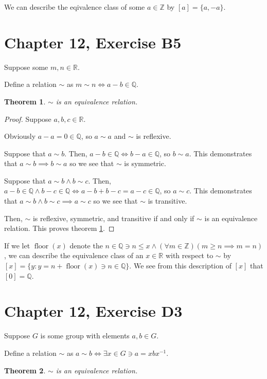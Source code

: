 \documentclass[12pt]{amsart}
\newcommand{\reals}{\mathbb{R}}
\newcommand{\rats}{\mathbb{Q}}
\newcommand{\ints}{\mathbb{Z}}
\newtheorem{thm}{Theorem}
\begin{document}
We can describe the eqivalence class of some $a \in \ints$
by $[a] = \{a, -a\}$.

\section{Chapter 12, Exercise B5}

Suppose some $m,n \in \reals$.

Define a relation $\sim$ as $m \sim n \iff a - b \in \rats$.

\begin{thm} \label{thm10}
	$\sim$ is an equivalence relation.
\end{thm}

\begin{proof}
	Suppose $a,b,c \in \reals$.

	Obviously $a - a = 0 \in \rats$,
	so $a \sim a$
	and $\sim$ is reflexive.

	Suppose that $a \sim b$.
	Then, $a - b \in \rats \iff b - a \in \rats$,
	so $b \sim a$.
	This demonstrates that $a \sim b \implies b \sim a$
	so we see that $\sim$ is symmetric.

	Suppose that $a \sim b \land b \sim c$.
	Then, $a - b \in \rats \land b - c \in \rats \iff a - b + b - c = a - c \in \rats$,
	so $a \sim c$.
	This demonstrates that $a \sim b \land b \sim c \implies a \sim c$
	so we see that $\sim$ is transitive.

	Then,
	$\sim$ is
	reflexive,
	symmetric,
	and transitive
	if and only if
	$\sim$ is an equivalence relation.
	This proves theorem \ref{thm10}.
\end{proof}

If we let $\operatorname{floor}(x)$ denote the
$n \in \rats \ni n \le x \land (\forall m \in \ints)(m \geq n \implies m = n)$,
we can describe the equivalence class of an $x \in \reals$
with respect to $\sim$ by $[x] = \{y: y = n + \operatorname{floor}(x) \ni n \in \rats \}$.
We see from this description of $[x]$ that $[0] = \rats$.

\section{Chapter 12, Exercise D3}

Suppose $G$ is some group with elements $a,b \in G$.

Define a relation $\sim$ as $a \sim b \iff \exists x \in G \ni a = xbx^{-1}$.

\begin{thm} \label{thm11}
	$\sim$ is an equivalence relation.
\end{thm}
\end{document}
